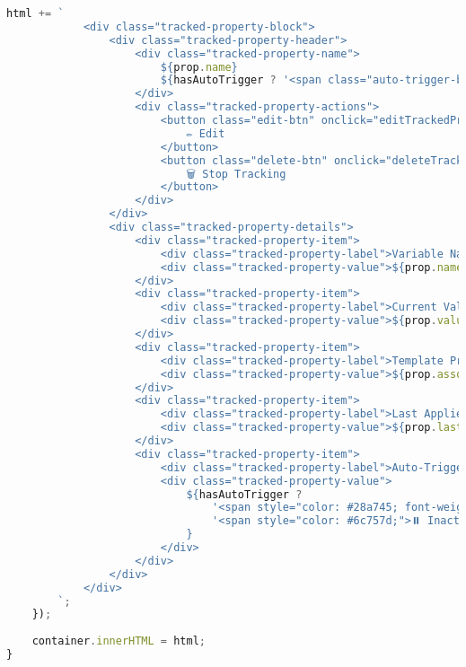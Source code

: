 \documentclass[12pt,a4paper]{article}
\begin{document}
\begin{lstlisting}[language=JavaScript, caption=Property Tracking Display]
        html += `
            <div class="tracked-property-block">
                <div class="tracked-property-header">
                    <div class="tracked-property-name">
                        ${prop.name}
                        ${hasAutoTrigger ? '<span class="auto-trigger-badge">🔄 Auto</span>' : ''}
                    </div>
                    <div class="tracked-property-actions">
                        <button class="edit-btn" onclick="editTrackedProperty('${prop.rowId}')">
                            ✏️ Edit
                        </button>
                        <button class="delete-btn" onclick="deleteTrackedProperty('${prop.rowId}')">
                            🗑️ Stop Tracking
                        </button>
                    </div>
                </div>
                <div class="tracked-property-details">
                    <div class="tracked-property-item">
                        <div class="tracked-property-label">Variable Name</div>
                        <div class="tracked-property-value">${prop.name}</div>
                    </div>
                    <div class="tracked-property-item">
                        <div class="tracked-property-label">Current Value</div>
                        <div class="tracked-property-value">${prop.value || 'Not set'}</div>
                    </div>
                    <div class="tracked-property-item">
                        <div class="tracked-property-label">Template Property</div>
                        <div class="tracked-property-value">${prop.associatedProperty.displayName}</div>
                    </div>
                    <div class="tracked-property-item">
                        <div class="tracked-property-label">Last Applied Value</div>
                        <div class="tracked-property-value">${prop.lastAppliedValue !== null ? prop.lastAppliedValue : 'Not applied'}</div>
                    </div>
                    <div class="tracked-property-item">
                        <div class="tracked-property-label">Auto-Trigger Status</div>
                        <div class="tracked-property-value">
                            ${hasAutoTrigger ? 
                                '<span style="color: #28a745; font-weight: bold;">🔄 Active</span>' : 
                                '<span style="color: #6c757d;">⏸️ Inactive</span>'
                            }
                        </div>
                    </div>
                </div>
            </div>
        `;
    });
    
    container.innerHTML = html;
}
\end{lstlisting}
\end{document}
